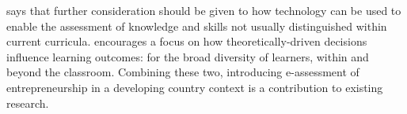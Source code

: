 
    \cite{luckin} says that further consideration should be given to how technology can be used to enable the assessment of knowledge and skills not usually distinguished within current curricula. \cite{gates} encourages a focus on how theoretically-driven decisions influence learning outcomes: for the broad diversity of learners, within and beyond the classroom. Combining these two, introducing e-assessment of entrepreneurship in a developing country context is a contribution to existing research.
